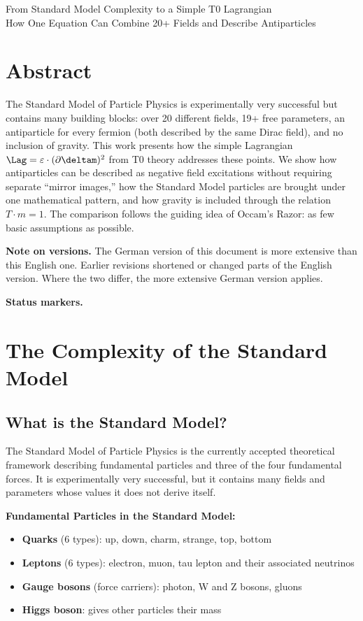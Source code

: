 From Standard Model Complexity to a Simple T0 Lagrangian \\
	 How One Equation Can Combine 20+ Fields and Describe Antiparticles
\section*{Abstract}
		The Standard Model of Particle Physics is experimentally very successful but contains many building blocks: over 20 different fields, 19+ free parameters, an antiparticle for every fermion (both described by the same Dirac field), and no inclusion of gravity. This work presents how the simple Lagrangian $\Lag = \varepsilon \cdot (\partial \deltam)^2$ from T0 theory addresses these points. We show how antiparticles can be described as negative field excitations without requiring separate ``mirror images,'' how the Standard Model particles are brought under one mathematical pattern, and how gravity is included through the relation $T \cdot m = 1$. The comparison follows the guiding idea of Occam's Razor: as few basic assumptions as possible.

	\medskip\noindent\textbf{Note on versions.} The German version of this document is more extensive than this English one. Earlier revisions shortened or changed parts of the English version. Where the two differ, the more extensive German version applies.



\medskip\noindent\textbf{Status markers.}


	

	\section{The Complexity of the Standard Model}
	
	\subsection{What is the Standard Model?}
	
	The Standard Model of Particle Physics is the currently accepted theoretical framework describing fundamental particles and three of the four fundamental forces. It is experimentally very successful, but it contains many fields and parameters whose values it does not derive itself.
	
	\textbf{Fundamental Particles in the Standard Model:}
	\begin{itemize}
		\item \textbf{Quarks} (6 types): up, down, charm, strange, top, bottom
		\item \textbf{Leptons} (6 types): electron, muon, tau lepton and their associated neutrinos
		\item \textbf{Gauge bosons} (force carriers): photon, W and Z bosons, gluons  
		\item \textbf{Higgs boson}: gives other particles their mass
	\end{itemize}
	
